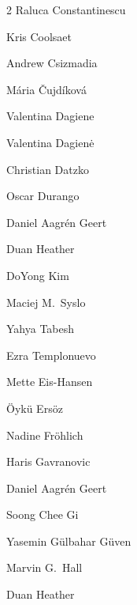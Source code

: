 \begin{multicols}{2}
 \ifdefined\AuthorConstantinescuRaluca {} Raluca Constantinescu\fi
 
 \ifdefined\AuthorCoolsaetKris {} Kris Coolsaet\fi
 
 \ifdefined\AuthorCsizmadiaAndrew {} Andrew Csizmadia\fi
 
 \ifdefined\AuthorCujdikovaMaria {} Mária Čujdíková\fi
 
 \ifdefined\AuthorDagieneValentina {} Valentina Dagiene\fi
 
 \ifdefined\AuthorDagieneValentina {} Valentina Dagienė\fi
 
 \ifdefined\AuthorDatzkoChristian {} Christian Datzko\fi
 
 \ifdefined\AuthorDurangoOscar {} Oscar Durango\fi
 
 \ifdefined\AuthorEditorGeertAagrenDaniel {} Daniel Aagrén Geert\fi
 
 \ifdefined\AuthorEditorHeatherDuan {} Duan Heather\fi
 
 \ifdefined\AuthorEditorKimDoYong {} DoYong Kim\fi
 
 \ifdefined\AuthorEditorSysloMMaciej {} Maciej M.~Syslo\fi
 
 \ifdefined\AuthorEditorTabeshYahya {} Yahya Tabesh\fi
 
 \ifdefined\AuthorEditorTemplonuevoEzra {} Ezra Templonuevo\fi
 
 \ifdefined\AuthorEisHansenMette {} Mette Eis-Hansen\fi
 
 \ifdefined\AuthorErsozOyku {} Öykü Ersöz\fi
 
 \ifdefined\AuthorFrohlichNadine {} Nadine Fröhlich\fi
 
 \ifdefined\AuthorGavranovicHaris {} Haris Gavranovic\fi
 
 \ifdefined\AuthorGeertAagrenDaniel {} Daniel Aagrén Geert\fi
 
 \ifdefined\AuthorGiCheeSoong {} Soong Chee Gi\fi
 
 \ifdefined\AuthorGuvenGulbaharYasemin {} Yasemin Gülbahar Güven\fi
 
 \ifdefined\AuthorHallGMarvin {} Marvin G.~Hall\fi
 
 \ifdefined\AuthorHeatherDuan {} Duan Heather\fi
 

\end{multicols}
